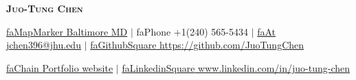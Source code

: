\documentclass[a4paper, 11pt]{article}
\newcommand{\seticon}[1]{\textcolor{myblue}{\csname #1\endcsname}}
\begin{document}

\begin{center}
    \textbf{\huge \scshape Juo-Tung Chen} \\ \vspace{13pt}

    

    \href{https://}{{\seticon{faMapMarker} Baltimore MD}} $|$ \small {\seticon{faPhone} +1(240) 565-5434 }   $|$ \href{mailto:jchen396@jhu.edu}{ \seticon{faAt} \underline{jchen396@jhu.edu}} $|$ 
    \href{https://github.com/JuoTungChen}{ \seticon{faGithubSquare} \underline{https://github.com/JuoTungChen} }
    
    \vspace{4pt} 
    \href{https://jjcc0704.wixsite.com/projects}{\seticon{faChain} \underline{ {Portfolio website}}} $|$ 
    \href{www.linkedin.com/in/juo-tung-chen/}{\seticon{faLinkedinSquare} \underline{ www.linkedin.com/in/juo-tung-chen}}




\end{center}
\end{document}
